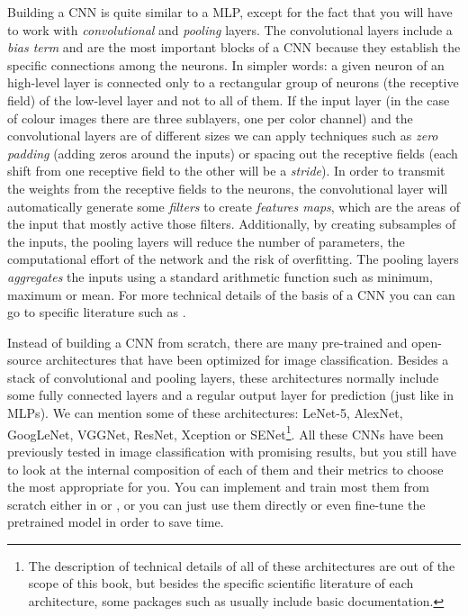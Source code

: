 Building a CNN is quite similar to a MLP, except for the fact that you will have to work with \textit{convolutional} and \textit{pooling} layers. The convolutional layers include a \textit{bias term} and are the most important blocks of a CNN because they establish the specific connections  among the neurons. In simpler words: a given neuron of an high-level layer is connected only to a rectangular group of neurons (the receptive field) of the low-level layer and not to all of them. If the input layer (in the case of colour images there are three sublayers, one per color channel) and the convolutional layers are of different sizes we can apply techniques such as \textit{zero padding} (adding zeros around the inputs) or spacing out the receptive fields (each shift from one receptive field to the other will be a \textit{stride}). In order to transmit the weights from the receptive fields to the neurons, the convolutional layer will automatically generate some \textit{filters} to create \textit{features maps}, which are the areas of the input that mostly active those filters. Additionally, by creating subsamples of the inputs, the pooling layers will reduce the number of parameters, the computational effort of the network and the risk of overfitting. The pooling layers \textit{aggregates} the inputs using a standard arithmetic function such as minimum, maximum or mean. For more technical details of the basis of a CNN you can can go to specific literature such as \cite{geron2019hands}.

Instead of building a CNN from scratch, there are many pre-trained and open-source architectures that have been optimized for image classification. Besides a stack of convolutional and pooling layers,  these architectures normally include some fully connected layers and a regular output layer for prediction (just like in MLPs). We can mention some of these architectures: LeNet-5, AlexNet, GoogLeNet, VGGNet, ResNet, Xception or SENet\footnote{The description of technical details of all of these architectures are out of the scope of this book, but besides the specific scientific literature of each architecture, some packages such as  usually include basic documentation.}. All these CNNs have been previously tested in image classification with promising results, but you still have to look at the internal composition of each of them and their metrics to choose the most appropriate for you. You can implement and train most them from scratch either in  or , or you can just use them directly or even fine-tune the pretrained model in order to save time. 

